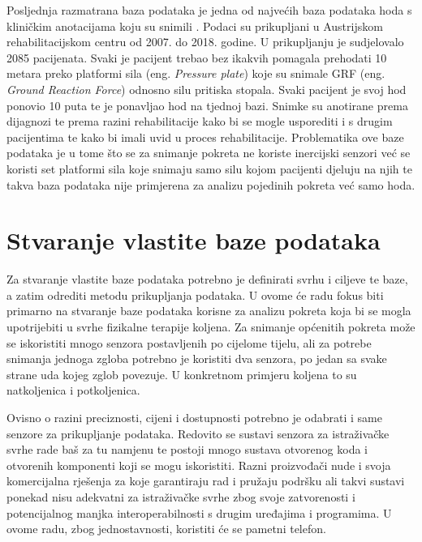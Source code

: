\documentclass[times, utf8, diplomski]{fer}
\begin{document}
Posljednja razmatrana baza podataka je jedna od najvećih baza podataka hoda s kliničkim anotacijama koju su snimili \cite{pressurePlate}.
Podaci su prikupljani u Austrijskom rehabilitacijskom centru od 2007. do 2018. godine. U prikupljanju je sudjelovalo 2085 pacijenata.
Svaki je pacijent trebao bez ikakvih pomagala prehodati 10 metara preko platformi sila (eng. \textit{Pressure plate}) koje su snimale
GRF (eng. \textit{Ground Reaction Force}) odnosno silu pritiska stopala. Svaki pacijent je svoj hod ponovio 10 puta te je ponavljao
hod na tjednoj bazi. Snimke su anotirane prema dijagnozi te prema razini rehabilitacije kako bi se mogle usporediti i s drugim
pacijentima te kako bi imali uvid u proces rehabilitacije. Problematika ove baze podataka je u tome što se za snimanje pokreta ne
koriste inercijski senzori već se koristi set platformi sila koje snimaju samo silu kojom pacijenti djeluju na njih te takva baza 
podataka nije primjerena za analizu pojedinih pokreta već samo hoda.



\chapter{Stvaranje vlastite baze podataka}
Za stvaranje vlastite baze podataka potrebno je definirati svrhu i ciljeve te baze, a zatim odrediti metodu prikupljanja podataka. U ovome će radu
fokus biti primarno na stvaranje baze podataka korisne za analizu pokreta koja bi se mogla upotrijebiti u svrhe fizikalne terapije koljena.
Za snimanje općenitih pokreta može se iskoristiti mnogo senzora postavljenih po cijelome tijelu, ali za potrebe snimanja jednoga zgloba potrebno je 
koristiti dva senzora, po jedan sa svake strane uda kojeg zglob povezuje. U konkretnom primjeru koljena to su natkoljenica i potkoljenica.

Ovisno o razini preciznosti, cijeni i dostupnosti potrebno je odabrati i same senzore za prikupljanje podataka. Redovito se sustavi senzora
za istraživačke svrhe rade baš za tu namjenu te postoji mnogo sustava otvorenog koda i otvorenih komponenti koji se mogu iskoristiti. Razni
proizvođači nude i svoja komercijalna rješenja za koje garantiraju rad i pružaju podršku ali takvi sustavi ponekad nisu adekvatni za
istraživačke svrhe zbog svoje zatvorenosti i potencijalnog manjka interoperabilnosti s drugim uređajima i programima. U ovome radu, zbog jednostavnosti,
koristiti će se pametni telefon.
\end{document}
